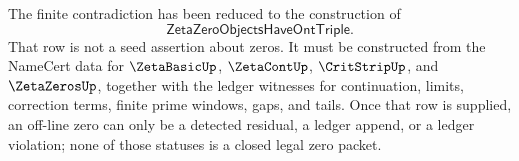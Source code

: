 \begin{principle}
\label{prin:rh-ontological-triple-construction-target}
The finite contradiction has been reduced to the construction of
$$
\mathsf{ZetaZeroObjectsHaveOntTriple}.
$$
That row is not a seed assertion about zeros.  It must be constructed
from the NameCert data for $\ZetaBasicUp$, $\ZetaContUp$,
$\CritStripUp$, and $\ZetaZerosUp$, together with the ledger witnesses
for continuation, limits, correction terms, finite prime windows, gaps,
and tails.  Once that row is supplied, an off-line zero can only be a
detected residual, a ledger append, or a ledger violation; none of those
statuses is a closed legal zero packet.
\end{principle}
